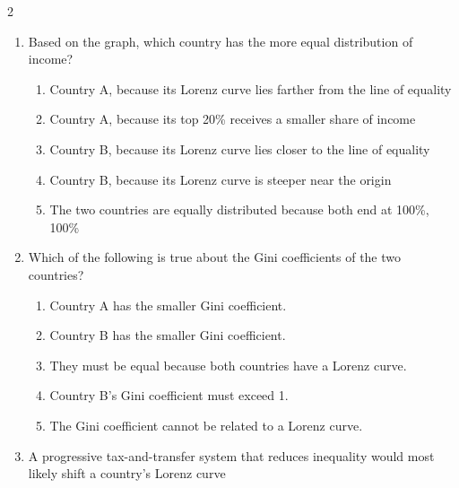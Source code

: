 \documentclass[10pt]{article}
\newenvironment{choiceslist}
  {\begin{enumerate}[label=(\Alph*), leftmargin=1.55em, itemsep=0.1em, topsep=0.15em, parsep=0pt]}
  {\end{enumerate}}
\newenvironment{stimulus}
  {\begin{center}\begin{minipage}{0.97\columnwidth}\footnotesize\itshape\setlength{\tabcolsep}{3pt}\renewcommand{\arraystretch}{0.96}}
  {\end{minipage}\end{center}}
\begin{document}
\begin{multicols*}{2}
\begin{stimulus}
\begin{center}
\end{center}
\end{stimulus}
\begin{enumerate}[resume*=curveq, leftmargin=*, itemsep=0.8em, topsep=0.18em, parsep=0pt]
\item Based on the graph, which country has the more equal distribution of income?
\begin{choiceslist}
\item Country A, because its Lorenz curve lies farther from the line of equality
\item Country A, because its top 20\% receives a smaller share of income
\item Country B, because its Lorenz curve lies closer to the line of equality
\item Country B, because its Lorenz curve is steeper near the origin
\item The two countries are equally distributed because both end at 100\%, 100\%
\end{choiceslist}
\item Which of the following is true about the Gini coefficients of the two countries?
\begin{choiceslist}
\item Country A has the smaller Gini coefficient.
\item Country B has the smaller Gini coefficient.
\item They must be equal because both countries have a Lorenz curve.
\item Country B's Gini coefficient must exceed 1.
\item The Gini coefficient cannot be related to a Lorenz curve.
\end{choiceslist}
\item A progressive tax-and-transfer system that reduces inequality would most likely shift a country's Lorenz curve

\end{enumerate}
\end{multicols*}
\end{document}
